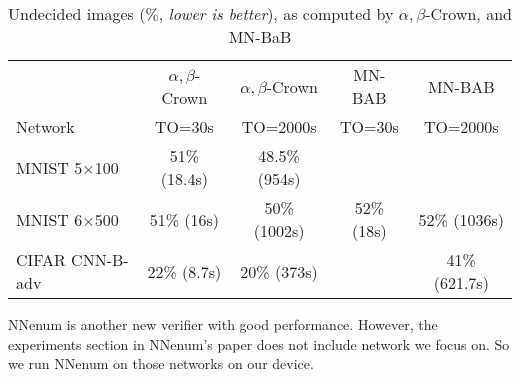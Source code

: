 \begin{table}[h!]
	\centering
		\caption{Undecided images ($\%$, {\em lower is better}), as computed by $\alpha,\beta$-Crown, and MN-BaB}
	\begin{tabular}{||l||c|c||c|c||}
		\hline \hline
		 & $\alpha,\beta$-Crown & $\alpha,\beta$-Crown & MN-BAB & MN-BAB \\ 
		 Network & TO=30s & TO=2000s &  TO=30s & TO=2000s \\ 
		\hline
		MNIST 5$\times$100 & 51\% (18.4s) & 48.5\%(954s) &  & \\ \hline
		MNIST 6$\times$500 & 51\% (16s) & 50\% (1002s) & 52\% (18s) & 52\% (1036s) \\ \hline
		CIFAR CNN-B-adv & 22\% (8.7s) & 20\% (373s) &  & 41\% (621.7s) \\ \hline 
	\end{tabular}
	\end{table}



NNenum is another new verifier with good performance. However, the experiments section in NNenum's paper does not include network we focus on. So we run NNenum on those networks on our device. 

